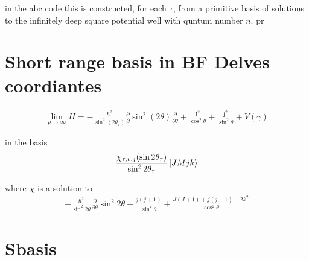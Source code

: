 \documentclass[aps,pra,onecolumn,showpacs,floatfix]{revtex4}
\begin{document}
in the abc code this is constructed, for each $\tau$, from a primitive basis of solutions to the
infinitely deep square potential well with quntum number $n$.
pr


\section{Short range basis in BF Delves coordiantes}
\begin{align}\label{eqn:delves}
	\lim_{\rho \to \infty}
	H = -\frac{\hbar^2}{\sin^2(2\theta_\tau)}\frac{\partial}{\partial}\sin^2(2\theta)\frac{\partial}{\partial\theta} + \frac{\mathbf{l}^2}{\cos^2\theta}+ \frac{\mathbf{j}^2}{\sin^2\theta} + V(\gamma)
\end{align}

in the basis
\begin{align}\label{eqn:delves}
	\frac{\chi_{\tau,v,j}(\sin{2\theta_\tau})}{\sin^2{2\theta_\tau}}\ket{JMjk}
\end{align}

where $\chi$ is a solution to
\begin{align}\label{eqn:delves}
	-\frac{\hbar^2}{\sin^2{2\theta}}\frac{\partial}{\partial\theta}\sin^2{2\theta} + \frac{j(j+1)}{\sin^2\theta} + \frac{J(J+1)+j(j+1)-2k^2}{\cos^2\theta}
\end{align}

\section{Sbasis}
\begin{acknowledgments}
\end{acknowledgments}


\end{document}
